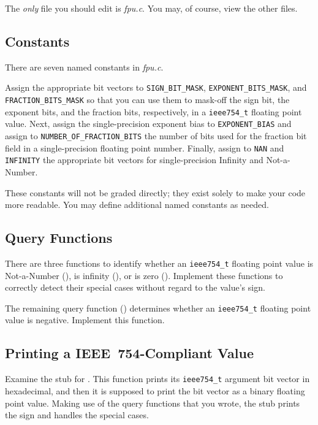     The \textit{only} file you should edit is \textit{fpu.c}.
    You may, of course, view the other files.

    \subsection{Constants}

    There are seven named constants in \textit{fpu.c}.

    Assign the appropriate bit vectors to \lstinline{SIGN_BIT_MASK}, \lstinline{EXPONENT_BITS_MASK}, and \lstinline{FRACTION_BITS_MASK} so that you can use them to mask-off the sign bit, the exponent bits, and the fraction bits, respectively, in a \lstinline{ieee754_t} floating point value.
    Next, assign the single-precision exponent bias to \lstinline{EXPONENT_BIAS} and assign to \lstinline{NUMBER_OF_FRACTION_BITS} the number of bits used for the fraction bit field in a single-precision floating point number.
    Finally, assign to \lstinline{NAN} and \lstinline{INFINITY} the appropriate bit vectors for single-precision Infinity and Not-a-Number.

    These constants will not be graded directly;
    they exist solely to make your code more readable.
    You may define additional named constants as needed.

    \subsection{Query Functions}

    There are three functions to identify whether an \lstinline{ieee754_t} floating point value is Not-a-Number (), is infinity (), or is zero ().
    Implement these functions to correctly detect their special cases without regard to the value's sign.

    The remaining query function () determines whether an \lstinline{ieee754_t} floating point value is negative.
    Implement this function.

    \subsection{Printing a IEEE~754-Compliant Value}

    Examine the stub for .
    This function prints its \lstinline{ieee754_t} argument bit vector in hexadecimal, and then it is supposed to print the bit vector as a binary floating point value.
    Making use of the query functions that you wrote, the stub prints the sign and handles the special cases.

